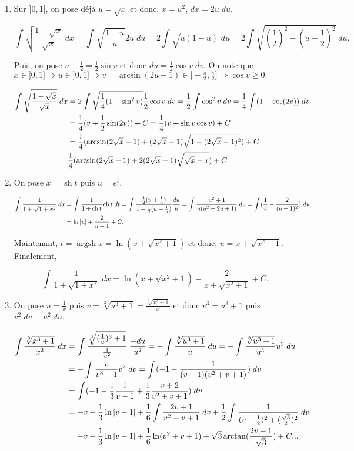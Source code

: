\documentclass[11pt,a4paper]{article}
\newcommand{\ch}{\mathop{\mathrm{ch}}\nolimits}
\newcommand{\sh}{\mathop{\mathrm{sh}}\nolimits}
\newcommand{\Arcsin}{\mathop{\mathrm{arcsin}}\nolimits}
\newcommand{\Arctan}{\mathop{\mathrm{arctan}}\nolimits}
\newcommand{\Argsh}{\mathop{\mathrm{argsh}}\nolimits}
\begin{document}
\begin{enumerate}
\item  Sur $]0,1]$, on pose déjà $u=\sqrt{x}$ et donc, $x=u^2$, $dx=2u\;du$.

$$\int_{}^{}\sqrt{\frac{1-\sqrt{x}}{\sqrt{x}}}\;dx=\int_{}^{}\sqrt{\frac{1-u}{u}}2u\;du=2\int_{}^{}\sqrt{u(1-u)}\;du
=2\int_{}^{}\sqrt{(\frac{1}{2})^2-(u-\frac{1}{2})^2}\;du.$$

Puis, on pose $u-\frac{1}{2}=\frac{1}{2}\sin v$ et donc $du=\frac{1}{2}\cos v\;dv$. 
On note que $x\in]0,1]\Rightarrow u\in]0,1]\Rightarrow v=\Arcsin(2u-1)\in]-\frac{\pi}{2},\frac{\pi}{2}]\Rightarrow\cos v\geq0.$

\begin{align*}\ensuremath
\int_{}^{}\sqrt{\frac{1-\sqrt{x}}{\sqrt{x}}}\;dx&=2\int_{}^{}\sqrt{\frac{1}{4}(1-\sin^2v)}\frac{1}{2}\cos v\;dv
=\frac{1}{2}\int_{}^{}\cos^2v\;dv=\frac{1}{4}\int_{}^{}(1+\cos(2v))\;dv\\
 &=\frac{1}{4}(v+\frac{1}{2}\sin(2v))+C=\frac{1}{4}(v+\sin v\cos v)+C\\
 &=\frac{1}{4}(\Arcsin(2\sqrt{x}-1)+(2\sqrt{x}-1)\sqrt{1-(2\sqrt{x}-1)^2})+C\\
 &\frac{1}{4}(\Arcsin(2\sqrt{x}-1)+2(2\sqrt{x}-1)\sqrt{\sqrt{x}-x})+C
\end{align*}

\item  On pose $x=\sh t$ puis $u=e^t$.

\begin{align*}\ensuremath
\int_{}^{}\frac{1}{1+\sqrt{1+x^2}}\;dx&=\int_{}^{}\frac{1}{1+\ch t}\ch t\;dt=\int_{}^{}\frac{\frac{1}{2}(u+\frac{1}{u})}{1+\frac{1}{2}(u+\frac{1}{u})}\frac{du}{u}
=\int_{}^{}\frac{u^2+1}{u(u^2+2u+1)}\;du=\int_{}^{}(\frac{1}{u}-\frac{2}{(u+1)^2})\;du\\
 &=\ln|u|+\frac{2}{u+1}+C.
\end{align*}

Maintenant, $t=\Argsh x=\ln(x+\sqrt{x^2+1})$ et donc, $u=x+\sqrt{x^2+1}$. Finalement,

$$\int_{}^{}\frac{1}{1+\sqrt{1+x^2}}\;dx=\ln(x+\sqrt{x^2+1})-\frac{2}{x+\sqrt{x^2+1}}+C.$$

\item  On pose $u=\frac{1}{x}$ puis $v=\sqrt[3]{u^3+1}=\frac{\sqrt[3]{x^3+1}}{x}$ et donc $v^3=u^3+1$ puis $v^2\;dv=u^2\;du$.

\begin{align*}\ensuremath
\int_{}^{}\frac{\sqrt[3]{x^3+1}}{x^2}\;dx&=\int_{}^{}\frac{\sqrt[3]{(\frac{1}{u})^3+1}}{\frac{1}{u^2}}\;\frac{-du}{u^2}=-\int_{}^{}\frac{\sqrt[3]{u^3+1}}{u}\;du=-\int_{}^{}\frac{\sqrt[3]{u^3+1}}{u^3}u^2\;du\\
 &=-\int_{}^{}\frac{v}{v^3-1}v^2\;dv=\int_{}^{}(-1-\frac{1}{(v-1)(v^2+v+1)})\;dv\\
 &=\int_{}^{}(-1-\frac{1}{3}\frac{1}{v-1}+\frac{1}{3}\frac{v+2}{v^2+v+1})\;dv\\
 &=-v-\frac{1}{3}\ln|v-1|+\frac{1}{6}\int_{}^{}\frac{2v+1}{v^2+v+1}\;dv+\frac{1}{2}\int_{}^{}\frac{1}{(v+\frac{1}{2})^2+(\frac{\sqrt{3}}{2})^2}\;dv\\
 &=-v-\frac{1}{3}\ln|v-1|+\frac{1}{6}\ln(v^2+v+1)+\sqrt{3}\Arctan(\frac{2v+1}{\sqrt{3}})+C...
\end{align*}
\end{enumerate}
\end{document}
